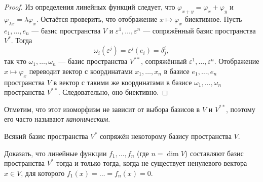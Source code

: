\begin{proof}
    Из определения линейных функций следует, что $\varphi_{x + y} = \varphi_x + \varphi_y$ и $\varphi_{\lambda x} = \lambda\varphi_x$. Остаётся проверить, что отображение $x \mapsto \varphi_x$ биективное. Пусть $e_1, \ldots, e_n$ --- базис пространства $V$ и $\varepsilon^1, \ldots, \varepsilon^n$ --- сопряжённый базис пространства $V^\ast$. Тогда
    \[
        \omega_i(\varepsilon^j) = \varepsilon^j(e_i) = \delta^i_j,
    \]
    так что $\omega_1, \ldots, \omega_n$ --- базис пространства $V^{\ast\ast}$, сопряжённый $\varepsilon^1, \ldots, \varepsilon^n$. Отображение $x \mapsto \varphi_x$ переводит вектор с координатами $x_1, \ldots, x_n$ в базисе $e_1, \ldots, e_n$ пространства $V$ в вектор с такими же координатами в базисе $\omega_1, \ldots, \omega_n$ пространства $V^{\ast\ast}$. Следовательно, оно биективно.
\end{proof}

Отметим, что этот изоморфизм не зависит от выбора базисов в $V$ и $V^{\ast\ast}$, поэтому его часто называют \textit{каноническим}.

\begin{corollary}
    Всякий базис пространства $V^\ast$ сопряжён некоторому базису пространства $V$.
\end{corollary}

\begin{problem}[Из Винберга]
    Доказать, что линейные функции $f_1, \ldots, f_n$ (где $n = \dim V$) составляют базис пространства $V^\ast$ тогда и только тогда, когда не существует ненулевого вектора $x \in V$, для которого $f_1(x) = \ldots = f_n(x) = 0$.
\end{problem}

